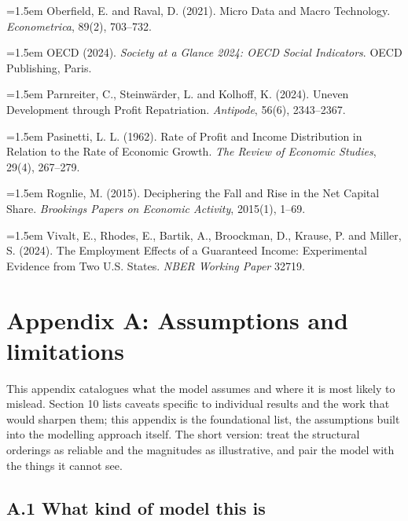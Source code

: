 \documentclass[11pt]{article}
\begin{document}
\hangindent=1.5em Oberfield, E. and Raval, D. (2021). Micro Data and Macro Technology. \textit{Econometrica}, 89(2), 703--732.\par\addvspace{0.45em}
\hangindent=1.5em OECD (2024). \textit{Society at a Glance 2024: OECD Social Indicators}. OECD Publishing, Paris.\par\addvspace{0.45em}
\hangindent=1.5em Parnreiter, C., Steinwärder, L. and Kolhoff, K. (2024). Uneven Development through Profit Repatriation. \textit{Antipode}, 56(6), 2343--2367.\par\addvspace{0.45em}
\hangindent=1.5em Pasinetti, L. L. (1962). Rate of Profit and Income Distribution in Relation to the Rate of Economic Growth. \textit{The Review of Economic Studies}, 29(4), 267--279.\par\addvspace{0.45em}
\hangindent=1.5em Rognlie, M. (2015). Deciphering the Fall and Rise in the Net Capital Share. \textit{Brookings Papers on Economic Activity}, 2015(1), 1--69.\par\addvspace{0.45em}
\hangindent=1.5em Vivalt, E., Rhodes, E., Bartik, A., Broockman, D., Krause, P. and Miller, S. (2024). The Employment Effects of a Guaranteed Income: Experimental Evidence from Two U.S. States. \textit{NBER Working Paper} 32719.\par\addvspace{0.45em}
\endgroup\normalsize


\appendix
\renewcommand{\thesection}{A}
\hypertarget{appendix-a-assumptions-and-limitations}{%
\section{Appendix A: Assumptions and
limitations}\label{appendix-a-assumptions-and-limitations}}

This appendix catalogues what the model assumes and where it is most
likely to mislead. Section 10 lists caveats specific to individual
results and the work that would sharpen them; this appendix is the
foundational list, the assumptions built into the modelling approach
itself. The short version: treat the structural orderings as reliable
and the magnitudes as illustrative, and pair the model with the things
it cannot see.

\hypertarget{a.1-what-kind-of-model-this-is}{%
\subsection{A.1 What kind of model this
is}\label{a.1-what-kind-of-model-this-is}}
\end{document}
